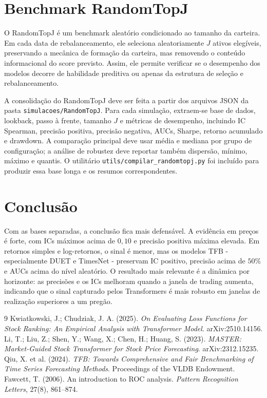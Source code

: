 \documentclass[12pt,a4paper]{article}
\begin{document}
\appendix
\section{Benchmark RandomTopJ}
\label{ap:randomtopj}

O RandomTopJ é um benchmark aleatório condicionado ao tamanho da carteira. Em cada data de rebalanceamento, ele seleciona aleatoriamente $J$ ativos elegíveis, preservando a mecânica de formação da carteira, mas removendo o conteúdo informacional do score previsto. Assim, ele permite verificar se o desempenho dos modelos decorre de habilidade preditiva ou apenas da estrutura de seleção e rebalanceamento.

A consolidação do RandomTopJ deve ser feita a partir dos arquivos JSON da pasta \texttt{simulacoes/RandomTopJ}. Para cada simulação, extraem-se base de dados, lookback, passo à frente, tamanho $J$ e métricas de desempenho, incluindo IC Spearman, precisão positiva, precisão negativa, AUCs, Sharpe, retorno acumulado e drawdown. A comparação principal deve usar média e mediana por grupo de configuração; a análise de robustez deve reportar também dispersão, mínimo, máximo e quantis. O utilitário \texttt{utils/compilar\_randomtopj.py} foi incluído para produzir essa base longa e os resumos correspondentes.

\section{Conclusão}

Com as bases separadas, a conclusão fica mais defensável. A evidência em preços é forte, com ICs máximos acima de $0{,}10$ e precisão positiva máxima elevada. Em retornos simples e log-retornos, o sinal é menor, mas os modelos TFB - especialmente DUET e TimesNet - preservam IC positivo, precisão acima de $50\%$ e AUCs acima do nível aleatório. O resultado mais relevante é a dinâmica por horizonte: as precisões e os ICs melhoram quando a janela de trading aumenta, indicando que o sinal capturado pelos Transformers é mais robusto em janelas de realização superiores a um pregão.

\begin{thebibliography}{9}
 Kwiatkowski, J.; Chudziak, J. A. (2025). \textit{On Evaluating Loss Functions for Stock Ranking: An Empirical Analysis with Transformer Model}. arXiv:2510.14156.
 Li, T.; Liu, Z.; Shen, Y.; Wang, X.; Chen, H.; Huang, S. (2023). \textit{MASTER: Market-Guided Stock Transformer for Stock Price Forecasting}. arXiv:2312.15235.
 Qiu, X. et al. (2024). \textit{TFB: Towards Comprehensive and Fair Benchmarking of Time Series Forecasting Methods}. Proceedings of the VLDB Endowment.
 Fawcett, T. (2006). An introduction to ROC analysis. \textit{Pattern Recognition Letters}, 27(8), 861--874.
\end{thebibliography}
\end{document}
